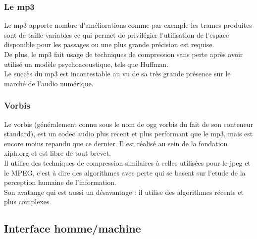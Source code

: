 		\subsubsection{Le mp3}
Le  mp3 apporte  nombre d'améliorations  comme  par  exemple  les trames
produites  sont  de  taille  variables  ce  qui  permet  de  privilégier
l'utilisation  de l'espace  disponible pour  les  passages  ou  une plus
grande précision est requise.\\
De plus, le mp3 fait usage de techniques de compression sans perte après
avoir utilisé un modèle psychoacoustique, tels que Huffman.\\
Le succès du mp3 est incontestable au  vu de sa très grande présence sur
le marché de l'audio numérique.

		\subsubsection{Vorbis}
Le vorbis (g\'en\'eralement  connu sous le nom de ogg  vorbis du fait de
son  conteneur  standard),  est  un  codec  audio  plus  recent  et plus
performant que le mp3, mais est encore moins repandu que ce dernier.  Il
est r\'ealis\'e  au sein de la  fondation xiph.org et est  libre de tout
brevet.\\
Il  utilise   des  techniques  de  compression   similaires  \`a  celles
utilis\'ees pour le jpeg et le MPEG, c'est \`a dire des algorithmes avec
perte  qui   se  basent  sur   l'etude  de  la   perception  humaine  de
l'information.\\
Son avatange qui est aussi un d\'esavantage : il utilise des algorithmes
r\'ecents et plus complexes.

\newpage

	\subsection{Interface homme/machine}
